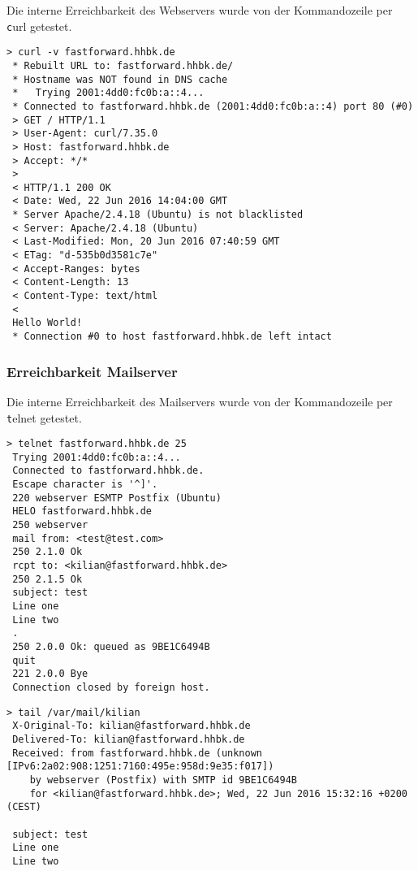 Die interne Erreichbarkeit des Webservers wurde von der Kommandozeile per {\texttt curl} getestet.\newline

\begin{lstlisting}[numbers=none]
> curl -v fastforward.hhbk.de
 * Rebuilt URL to: fastforward.hhbk.de/
 * Hostname was NOT found in DNS cache
 *   Trying 2001:4dd0:fc0b:a::4...
 * Connected to fastforward.hhbk.de (2001:4dd0:fc0b:a::4) port 80 (#0)
 > GET / HTTP/1.1
 > User-Agent: curl/7.35.0
 > Host: fastforward.hhbk.de
 > Accept: */*
 > 
 < HTTP/1.1 200 OK
 < Date: Wed, 22 Jun 2016 14:04:00 GMT
 * Server Apache/2.4.18 (Ubuntu) is not blacklisted
 < Server: Apache/2.4.18 (Ubuntu)
 < Last-Modified: Mon, 20 Jun 2016 07:40:59 GMT
 < ETag: "d-535b0d3581c7e"
 < Accept-Ranges: bytes
 < Content-Length: 13
 < Content-Type: text/html
 < 
 Hello World!
 * Connection #0 to host fastforward.hhbk.de left intact
\end{lstlisting}

\subsubsection{Erreichbarkeit Mailserver}

Die interne Erreichbarkeit des Mailservers wurde von der Kommandozeile per {\texttt telnet} getestet.\newline

\begin{lstlisting}[numbers=none]
> telnet fastforward.hhbk.de 25
 Trying 2001:4dd0:fc0b:a::4...
 Connected to fastforward.hhbk.de.
 Escape character is '^]'.
 220 webserver ESMTP Postfix (Ubuntu)
 HELO fastforward.hhbk.de
 250 webserver
 mail from: <test@test.com>
 250 2.1.0 Ok
 rcpt to: <kilian@fastforward.hhbk.de>
 250 2.1.5 Ok
 subject: test
 Line one
 Line two
 .
 250 2.0.0 Ok: queued as 9BE1C6494B
 quit
 221 2.0.0 Bye
 Connection closed by foreign host.
\end{lstlisting}

\begin{lstlisting}[numbers=none]
> tail /var/mail/kilian 
 X-Original-To: kilian@fastforward.hhbk.de
 Delivered-To: kilian@fastforward.hhbk.de
 Received: from fastforward.hhbk.de (unknown [IPv6:2a02:908:1251:7160:495e:958d:9e35:f017])
	by webserver (Postfix) with SMTP id 9BE1C6494B
	for <kilian@fastforward.hhbk.de>; Wed, 22 Jun 2016 15:32:16 +0200 (CEST)

 subject: test
 Line one
 Line two
\end{lstlisting}

